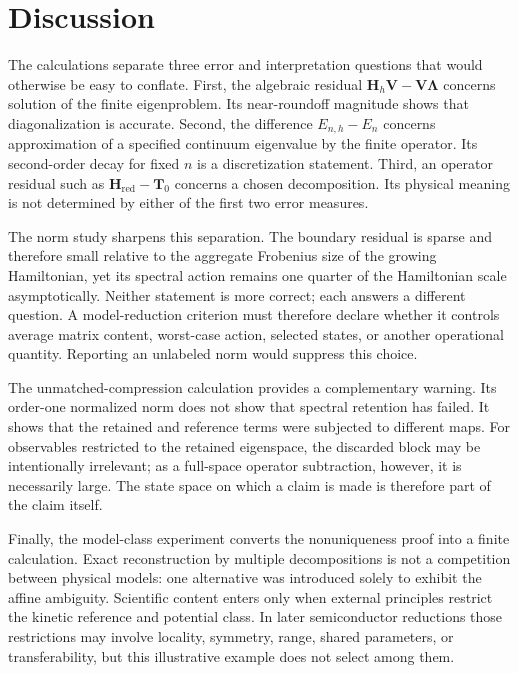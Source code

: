 \documentclass[11pt]{article}
\begin{document}
\clearpage
\section{Discussion}

The calculations separate three error and interpretation questions that would
otherwise be easy to conflate. First, the algebraic residual
$\mathbf H_h\mathbf V-\mathbf V\boldsymbol\Lambda$ concerns solution of the
finite eigenproblem. Its near-roundoff magnitude shows that diagonalization is
accurate. Second, the difference $E_{n,h}-E_n$ concerns approximation of a
specified continuum eigenvalue by the finite operator. Its second-order decay
for fixed $n$ is a discretization statement. Third, an operator residual such
as $\mathbf H_{\mathrm{red}}-\mathbf T_0$ concerns a chosen decomposition. Its
physical meaning is not determined by either of the first two error measures.

The norm study sharpens this separation. The boundary residual is sparse and
therefore small relative to the aggregate Frobenius size of the growing
Hamiltonian, yet its spectral action remains one quarter of the Hamiltonian
scale asymptotically. Neither statement is more correct; each answers a
different question. A model-reduction criterion must therefore declare whether
it controls average matrix content, worst-case action, selected states, or
another operational quantity. Reporting an unlabeled norm would suppress this
choice.

The unmatched-compression calculation provides a complementary warning. Its
order-one normalized norm does not show that spectral retention has failed. It
shows that the retained and reference terms were subjected to different maps.
For observables restricted to the retained eigenspace, the discarded block may
be intentionally irrelevant; as a full-space operator subtraction, however, it
is necessarily large. The state space on which a claim is made is therefore
part of the claim itself.

Finally, the model-class experiment converts the nonuniqueness proof into a
finite calculation. Exact reconstruction by multiple decompositions is not a
competition between physical models: one alternative was introduced solely to
exhibit the affine ambiguity. Scientific content enters only when external
principles restrict the kinetic reference and potential class. In later
semiconductor reductions those restrictions may involve locality, symmetry,
range, shared parameters, or transferability, but this illustrative example
does not select among them.
\end{document}

